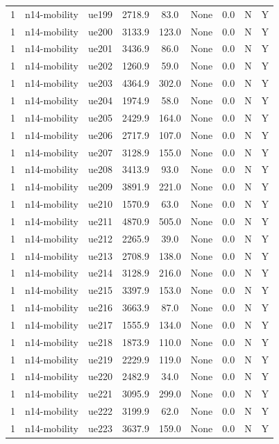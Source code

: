 \begin{table}[ht]
\begin{tabular}{|c|c|c|c|c|c|c|c|c|}
1 & n14-mobility & ue199 & 2718.9 & 83.0 & None & 0.0 & N & Y \\
1 & n14-mobility & ue200 & 3133.9 & 123.0 & None & 0.0 & N & Y \\
1 & n14-mobility & ue201 & 3436.9 & 86.0 & None & 0.0 & N & Y \\
1 & n14-mobility & ue202 & 1260.9 & 59.0 & None & 0.0 & N & Y \\
1 & n14-mobility & ue203 & 4364.9 & 302.0 & None & 0.0 & N & Y \\
1 & n14-mobility & ue204 & 1974.9 & 58.0 & None & 0.0 & N & Y \\
1 & n14-mobility & ue205 & 2429.9 & 164.0 & None & 0.0 & N & Y \\
1 & n14-mobility & ue206 & 2717.9 & 107.0 & None & 0.0 & N & Y \\
1 & n14-mobility & ue207 & 3128.9 & 155.0 & None & 0.0 & N & Y \\
1 & n14-mobility & ue208 & 3413.9 & 93.0 & None & 0.0 & N & Y \\
1 & n14-mobility & ue209 & 3891.9 & 221.0 & None & 0.0 & N & Y \\
1 & n14-mobility & ue210 & 1570.9 & 63.0 & None & 0.0 & N & Y \\
1 & n14-mobility & ue211 & 4870.9 & 505.0 & None & 0.0 & N & Y \\
1 & n14-mobility & ue212 & 2265.9 & 39.0 & None & 0.0 & N & Y \\
1 & n14-mobility & ue213 & 2708.9 & 138.0 & None & 0.0 & N & Y \\
1 & n14-mobility & ue214 & 3128.9 & 216.0 & None & 0.0 & N & Y \\
1 & n14-mobility & ue215 & 3397.9 & 153.0 & None & 0.0 & N & Y \\
1 & n14-mobility & ue216 & 3663.9 & 87.0 & None & 0.0 & N & Y \\
1 & n14-mobility & ue217 & 1555.9 & 134.0 & None & 0.0 & N & Y \\
1 & n14-mobility & ue218 & 1873.9 & 110.0 & None & 0.0 & N & Y \\
1 & n14-mobility & ue219 & 2229.9 & 119.0 & None & 0.0 & N & Y \\
1 & n14-mobility & ue220 & 2482.9 & 34.0 & None & 0.0 & N & Y \\
1 & n14-mobility & ue221 & 3095.9 & 299.0 & None & 0.0 & N & Y \\
1 & n14-mobility & ue222 & 3199.9 & 62.0 & None & 0.0 & N & Y \\
1 & n14-mobility & ue223 & 3637.9 & 159.0 & None & 0.0 & N & Y \\

\end{tabular}
\end{table}
